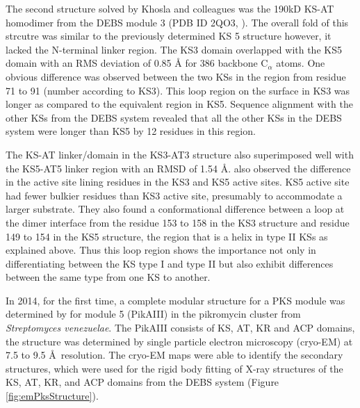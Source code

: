 		The second structure solved by Khosla and colleagues was the 190kD KS-AT homodimer from the DEBS module 3 (PDB ID 2QO3, \textcite{Tang2007}). The overall fold of this strcutre was similar to the previously determined KS 5 structure however, it lacked the N-terminal linker region. The KS3 domain overlapped with the KS5 domain with an RMS deviation of 0.85 \AA{} for 386 backbone C$_{\alpha}$ atoms. One obvious difference was observed between the two KSs in the region from residue 71 to 91 (number according to KS3). This loop region on the surface in KS3 was longer as compared to the equivalent region in KS5. Sequence alignment with the other KSs from the DEBS system revealed that all the other KSs in the DEBS system were longer than KS5 by 12 residues in this region. 
		
		The KS-AT linker/domain in the KS3-AT3 structure also superimposed well with the KS5-AT5 linker region with an RMSD of 1.54 \AA{}. \textcite{Tang2007} also observed the difference in the active site lining residues in the KS3 and KS5 active sites. KS5 active site had fewer bulkier residues than KS3 active site, presumably to accommodate a larger substrate. They also found a conformational difference between a loop at the dimer interface from the residue 153 to 158 in the KS3 structure and residue 149 to 154 in the KS5 structure, the region that is a helix in type II KSs as explained above. Thus this loop region shows the importance not only in differentiating between the KS type I and type II but also exhibit differences between the same type from one KS to another. %
		
		In 2014, for the first time, a complete modular structure for a PKS module was determined by \textcite{Dutta2014} for module 5 (PikAIII) in the pikromycin cluster from \textit{Streptomyces venezuelae}. The PikAIII consists of KS, AT, KR and ACP domains, the structure was determined by single particle electron microscopy (cryo-EM) at 7.5 to 9.5 \AA \ resolution. The cryo-EM maps were able to identify the secondary structures, which were used for the rigid body fitting of X-ray structures of the KS, AT, KR, and ACP domains from the DEBS system (Figure \ref{fig:emPksStructure}).

